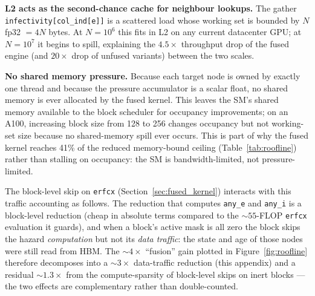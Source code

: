 \documentclass[a4paper,fleqn]{cas-sc}
\theoremstyle{definition}
\theoremstyle{remark}
\begin{document}
\textbf{L2 acts as the second-chance cache for neighbour lookups.} The gather \texttt{infectivity[col\_ind[e]]} is a scattered load whose working set is bounded by $N$ fp32 $= 4N$ bytes. At $N = 10^6$ this fits in L2 on any current datacenter GPU; at $N = 10^7$ it begins to spill, explaining the $4.5\times$ throughput drop of the fused engine (and $20\times$ drop of unfused variants) between the two scales.

\textbf{No shared memory pressure.} Because each target node is owned by exactly one thread and because the pressure accumulator is a scalar float, no shared memory is ever allocated by the fused kernel. This leaves the SM's shared memory available to the block scheduler for occupancy improvements; on an A100, increasing block size from 128 to 256 changes occupancy but not working-set size because no shared-memory spill ever occurs. This is part of why the fused kernel reaches 41\% of the reduced memory-bound ceiling (Table~\ref{tab:roofline}) rather than stalling on occupancy: the SM is bandwidth-limited, not pressure-limited.

The block-level skip on \texttt{erfcx} (Section~\ref{sec:fused_kernel}) interacts with this traffic accounting as follows. The reduction that computes \texttt{any\_e} and \texttt{any\_i} is a block-level reduction (cheap in absolute terms compared to the $\sim$$55$-FLOP \texttt{erfcx} evaluation it guards), and when a block's active mask is all zero the block skips the hazard \emph{computation} but not its \emph{data traffic}: the state and age of those nodes were still read from HBM. The $\sim$$4\times$ ``fusion'' gain plotted in Figure~\ref{fig:roofline} therefore decomposes into a $\sim$$3\times$ data-traffic reduction (this appendix) and a residual $\sim$$1.3\times$ from the compute-sparsity of block-level skips on inert blocks --- the two effects are complementary rather than double-counted.




\clearpage
\null\label{__fs_lastpage}
\end{document}
